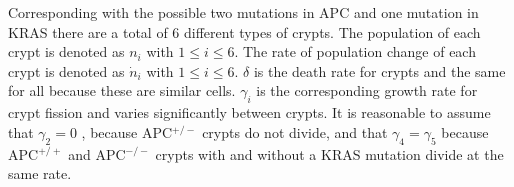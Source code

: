 Corresponding with the possible two mutations in APC and one mutation in KRAS there are a total of 6 different types of crypts.  
The population of each crypt is denoted as $n_i$ with $1 \leq i \leq 6$. 
The rate of population change of each crypt is denoted as $\dot{n}_i$ with $1 \leq i \leq 6$.
$\delta$ is the death rate for crypts and the same for all because these are similar cells. 
$\gamma_i$ is the corresponding growth rate for crypt fission and varies significantly between crypts.
It is reasonable to assume that $\gamma_2 = 0$ , because APC$^{+/-}$ crypts do not divide, and that $\gamma_4 = \gamma_5$ because APC$^{+/+}$ and APC$^{-/-}$ crypts with and without a KRAS mutation divide at the same rate.





